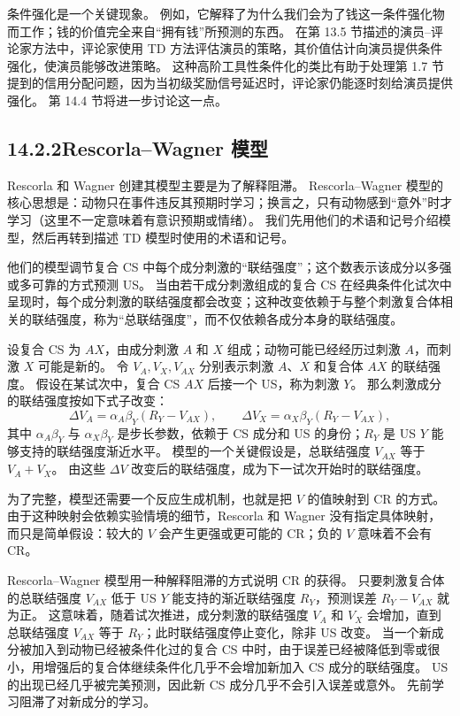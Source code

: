 \documentclass[UTF8,12pt,a4paper,fontset=fandol]{ctexart}
\begin{document}
条件强化是一个关键现象。
例如，它解释了为什么我们会为了钱这一条件强化物而工作；钱的价值完全来自“拥有钱”所预测的东西。
在第 13.5 节描述的演员--评论家方法中，评论家使用 TD 方法评估演员的策略，其价值估计向演员提供条件强化，使演员能够改进策略。
这种高阶工具性条件化的类比有助于处理第 1.7 节提到的信用分配问题，因为当初级奖励信号延迟时，评论家仍能逐时刻给演员提供强化。
第 14.4 节将进一步讨论这一点。

\subsection*{14.2.2\quad Rescorla--Wagner 模型}

Rescorla 和 Wagner 创建其模型主要是为了解释阻滞。
Rescorla--Wagner 模型的核心思想是：动物只在事件违反其预期时学习；换言之，只有动物感到“意外”时才学习（这里不一定意味着有意识预期或情绪）。
我们先用他们的术语和记号介绍模型，然后再转到描述 TD 模型时使用的术语和记号。

他们的模型调节复合 CS 中每个成分刺激的“联结强度”；这个数表示该成分以多强或多可靠的方式预测 US。
当由若干成分刺激组成的复合 CS 在经典条件化试次中呈现时，每个成分刺激的联结强度都会改变；这种改变依赖于与整个刺激复合体相关的联结强度，称为“总联结强度”，而不仅依赖各成分本身的联结强度。

设复合 CS 为 $AX$，由成分刺激 $A$ 和 $X$ 组成；动物可能已经经历过刺激 $A$，而刺激 $X$ 可能是新的。
令 $V_A,V_X,V_{AX}$ 分别表示刺激 $A$、$X$ 和复合体 $AX$ 的联结强度。
假设在某试次中，复合 CS $AX$ 后接一个 US，称为刺激 $Y$。
那么刺激成分的联结强度按如下式子改变：
\[
\Delta V_A=\alpha_A\beta_Y(R_Y-V_{AX}),\qquad
\Delta V_X=\alpha_X\beta_Y(R_Y-V_{AX}),
\]
其中 $\alpha_A\beta_Y$ 与 $\alpha_X\beta_Y$ 是步长参数，依赖于 CS 成分和 US 的身份；$R_Y$ 是 US $Y$ 能够支持的联结强度渐近水平。
模型的一个关键假设是，总联结强度 $V_{AX}$ 等于 $V_A+V_X$。
由这些 $\Delta V$ 改变后的联结强度，成为下一试次开始时的联结强度。

为了完整，模型还需要一个反应生成机制，也就是把 $V$ 的值映射到 CR 的方式。
由于这种映射会依赖实验情境的细节，Rescorla 和 Wagner 没有指定具体映射，而只是简单假设：较大的 $V$ 会产生更强或更可能的 CR；负的 $V$ 意味着不会有 CR。

Rescorla--Wagner 模型用一种解释阻滞的方式说明 CR 的获得。
只要刺激复合体的总联结强度 $V_{AX}$ 低于 US $Y$ 能支持的渐近联结强度 $R_Y$，预测误差 $R_Y-V_{AX}$ 就为正。
这意味着，随着试次推进，成分刺激的联结强度 $V_A$ 和 $V_X$ 会增加，直到总联结强度 $V_{AX}$ 等于 $R_Y$；此时联结强度停止变化，除非 US 改变。
当一个新成分被加入到动物已经被条件化过的复合 CS 中时，由于误差已经被降低到零或很小，用增强后的复合体继续条件化几乎不会增加新加入 CS 成分的联结强度。
US 的出现已经几乎被完美预测，因此新 CS 成分几乎不会引入误差或意外。
先前学习阻滞了对新成分的学习。
\end{document}
